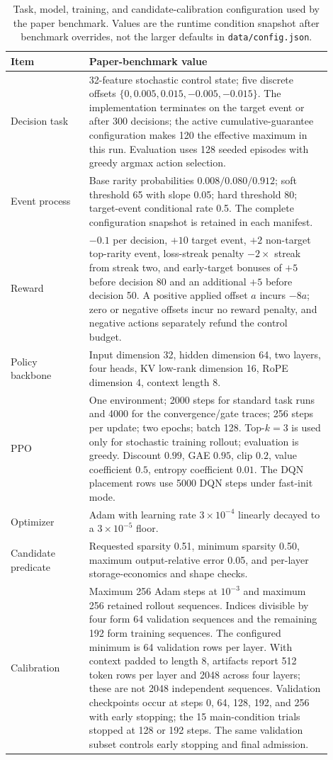 \documentclass{article}
\begin{document}
\begin{table}[t]
\centering
\caption{Task, model, training, and candidate-calibration configuration used
by the paper benchmark. Values are the runtime condition snapshot after
benchmark overrides, not the larger defaults in \texttt{data/config.json}.}
\label{tab:task-training-config}
\small
\begin{tabular}{p{0.22\linewidth}p{0.68\linewidth}}
\toprule
Item & Paper-benchmark value \\
\midrule
Decision task &
32-feature stochastic control state; five discrete offsets
$\{0,0.005,0.015,-0.005,-0.015\}$. The implementation terminates on the
target event or after 300 decisions; the active cumulative-guarantee
configuration makes 120 the effective maximum in this run. Evaluation uses 128
seeded episodes with greedy argmax action selection. \\
Event process &
Base rarity probabilities $0.008/0.080/0.912$; soft threshold 65 with slope
0.05; hard threshold 80; target-event conditional rate 0.5. The complete
configuration snapshot is retained in each manifest. \\
Reward &
$-0.1$ per decision, $+10$ target event, $+2$ non-target top-rarity event,
loss-streak penalty $-2\times$ streak from streak two, and early-target bonuses
of $+5$ before decision 80 and an additional $+5$ before decision 50. A
positive applied offset $a$ incurs $-8a$; zero or negative offsets incur no
reward penalty, and negative actions separately refund the control budget. \\
Policy backbone &
Input dimension 32, hidden dimension 64, two layers, four heads, KV low-rank
dimension 16, RoPE dimension 4, context length 8. \\
PPO &
One environment; 2000 steps for standard task runs and 4000 for the
convergence/gate traces; 256 steps per update; two epochs; batch 128. Top-$k=3$
is used only for stochastic training rollout; evaluation is greedy. Discount
$0.99$, GAE $0.95$, clip $0.2$, value coefficient $0.5$, entropy coefficient
$0.01$. The DQN placement rows use 5000 DQN steps under fast-init mode.
\\
Optimizer &
Adam with learning rate $3\times10^{-4}$ linearly decayed to a
$3\times10^{-5}$ floor. \\
Candidate predicate &
Requested sparsity 0.51, minimum sparsity 0.50, maximum output-relative error
0.05, and per-layer storage-economics and shape checks. \\
Calibration &
Maximum 256 Adam steps at $10^{-3}$ and maximum 256 retained rollout
sequences. Indices divisible by four form 64 validation sequences and the
remaining 192 form training sequences. The configured minimum is 64 validation
rows per layer. With context padded to length 8, artifacts report 512 token
rows per layer and 2048 across four layers; these are not 2048 independent
sequences. Validation checkpoints occur at steps 0, 64, 128, 192, and 256 with
early stopping; the 15 main-condition trials stopped at 128 or 192 steps. The
same validation subset controls early stopping and final admission. \\
\bottomrule
\end{tabular}
\end{table}
\end{document}

